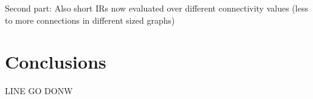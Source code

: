 \documentclass{article}
\begin{document}
Second part: Also short IRs now evaluated over different connectivity values (less to more connections in different sized graphs)

\section{Conclusions}
\label{sec:conclusion}
LINE GO DONW

	

% 
% 
\end{document}
